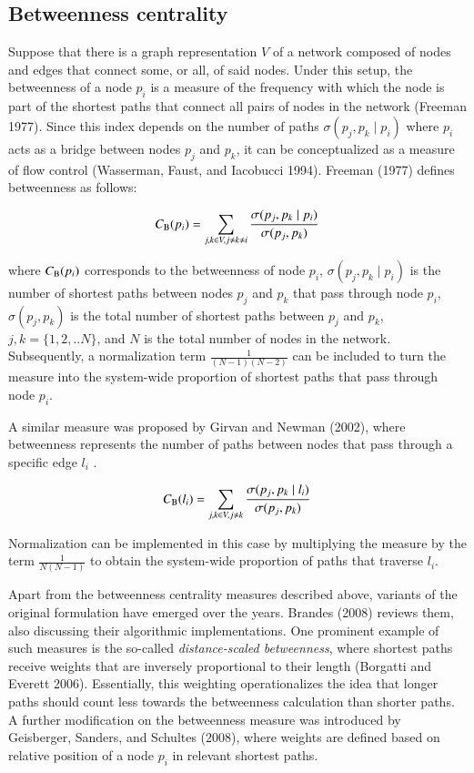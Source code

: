 \documentclass[]{elsarticle} %
\begin{document}
\hypertarget{betweenness-centrality}{%
\subsection{Betweenness centrality}\label{betweenness-centrality}}

Suppose that there is a graph representation \(V\) of a network composed
of nodes and edges that connect some, or all, of said nodes. Under this
setup, the betweenness of a node \(p_i\) is a measure of the frequency
with which the node is part of the shortest paths that connect all pairs
of nodes in the network (Freeman 1977). Since this index depends on the
number of paths \(\sigma(p_j,p_k \mid p_i)\) where \(p_i\) acts as a
bridge between nodes \(p_j\) and \(p_k\), it can be conceptualized as a
measure of flow control (Wasserman, Faust, and Iacobucci 1994). Freeman
(1977) defines betweenness as follows:

\begin{equation}\label{f:btw_node}
C_{\rm B}(p_i) =\sum_{j,k \space \in V,j\neq k {\neq i}} \frac{{\sigma(p_j,p_k \mid p_i)}}{\sigma(p_j,p_k)}
\end{equation}

\noindent where \(C_{\rm B}(p_i)\) corresponds to the betweenness of
node \(p_i\), \({\sigma(p_j,p_k \mid p_i)}\) is the number of shortest
paths between nodes \(p_j\) and \(p_k\) that pass through node \(p_i\),
\(\sigma(p_j,p_k)\) is the total number of shortest paths between
\(p_j\) and \(p_k\), \(j,k=\{1,2,..N\}\), and \(N\) is the total number
of nodes in the network. Subsequently, a normalization term
\(\frac{1}{(N-1)(N-2)}\) can be included to turn the measure into the
system-wide proportion of shortest paths that pass through node \(p_i\).

A similar measure was proposed by Girvan and Newman (2002), where
betweenness represents the number of paths between nodes that pass
through a specific edge \(l_i\) .

\begin{equation}\label{f:btw_link}
C_{\rm B}(l_i) =\sum\limits_{j,k \space \in V,j\neq k} \frac{{\sigma(p_j,p_k \mid l_i)}}{\sigma(p_j,p_k)}
\end{equation}

Normalization can be implemented in this case by multiplying the measure
by the term \(\frac{1}{N(N-1)}\) to obtain the system-wide proportion of
paths that traverse \(l_i\).

Apart from the betweenness centrality measures described above, variants
of the original formulation have emerged over the years. Brandes (2008)
reviews them, also discussing their algorithmic implementations. One
prominent example of such measures is the so-called
\textit{distance-scaled betweenness}, where shortest paths receive
weights that are inversely proportional to their length (Borgatti and
Everett 2006). Essentially, this weighting operationalizes the idea that
longer paths should count less towards the betweenness calculation than
shorter paths. A further modification on the betweenness measure was
introduced by Geisberger, Sanders, and Schultes (2008), where weights
are defined based on relative position of a node \(p_i\) in relevant
shortest paths.
\end{document}
